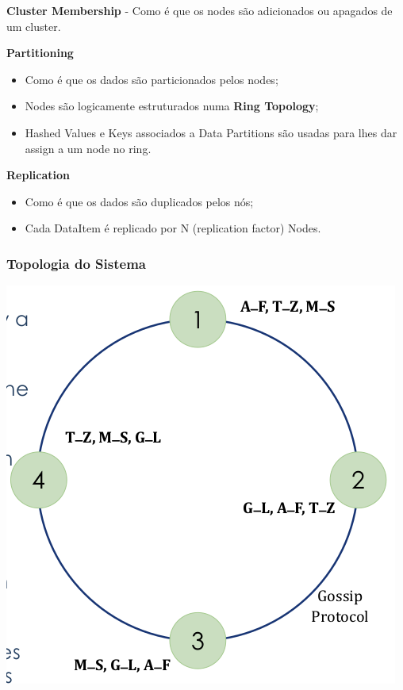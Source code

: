 \documentclass{article}
\begin{document}
\begin{flushleft}
  \textbf{Cluster Membership} - Como é que os nodes são adicionados ou
  apagados de um cluster.

  \vspace{2mm}

  \textbf{Partitioning}
  \begin{itemize}
    \item Como é que os dados são particionados pelos nodes;
    \item Nodes são logicamente estruturados numa \textbf{Ring Topology};
    \item Hashed Values e Keys associados a Data Partitions são usadas para
    lhes dar assign a um node no ring.
  \end{itemize}

  \vspace{2mm}

  \textbf{Replication}
  \begin{itemize}
    \item Como é que os dados são duplicados pelos nós;
    \item Cada DataItem é replicado por N (replication factor) Nodes.
  \end{itemize}
\end{flushleft}

\subsubsection{Topologia do Sistema}

\begin{center}
  \includegraphics[scale=0.3]{14}
\end{center}
\end{document}
